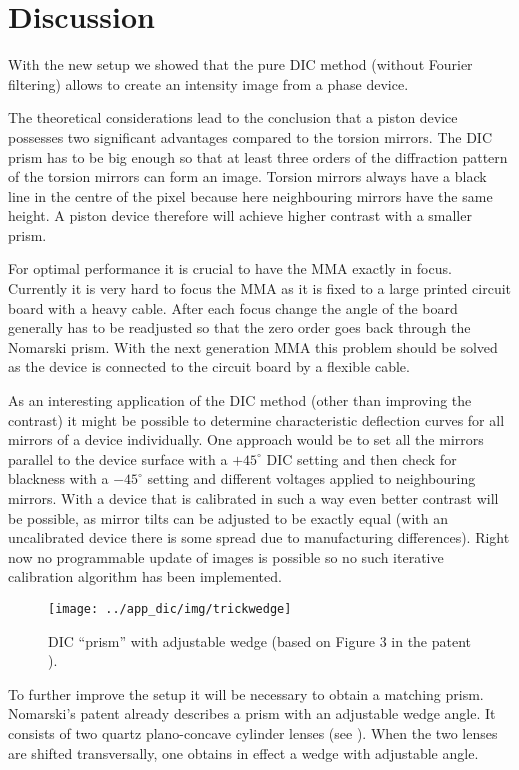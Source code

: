 \section{Discussion}
With the new setup we showed that the pure DIC method (without Fourier
filtering) allows to create an intensity image from a phase device.

The theoretical considerations lead to the conclusion that a piston
device possesses two significant advantages compared to the torsion
mirrors. The DIC prism has to be big enough so that at least three
orders of the diffraction pattern of the torsion mirrors can form an
image. Torsion mirrors always have a black line in the centre of the
pixel because here neighbouring mirrors have the same height. A piston
device therefore will achieve higher contrast with a smaller prism.

For optimal performance it is crucial to have the MMA exactly in
focus. Currently it is very hard to focus the MMA as it is fixed to a
large printed circuit board with a heavy cable. After each focus
change the angle of the board generally has to be readjusted so that
the zero order goes back through the Nomarski prism. With the next
generation MMA this problem should be solved as the device is
connected to the circuit board by a flexible cable.

As an interesting application of the DIC method (other than improving
the contrast) it might be possible to determine characteristic
deflection curves for all mirrors of a device individually. One
approach would be to set all the mirrors parallel to the device
surface with a $+45^\circ$ DIC setting and then check for blackness
with a $-45^\circ$ setting and different voltages applied to
neighbouring mirrors. With a device that is calibrated in such a way
even better contrast will be possible, as mirror tilts can be adjusted
to be exactly equal (with an uncalibrated device there is some spread
due to manufacturing differences). Right now no programmable update of
images is possible so no such iterative calibration algorithm has been
implemented.

\begin{figure}[p]
  \centering
  \texttt{[image: ../app\_dic/img/trickwedge]}
  \caption{DIC ``prism'' with adjustable wedge (based on Figure 3
    in the patent \cite{1960Nomarski}).}
  \label{fig:trickwedge}
\end{figure}

To further improve the setup it will be necessary to obtain a matching
prism.  Nomarski's patent \cite{1960Nomarski} already describes a
prism with an adjustable wedge angle. It consists of two quartz
plano-concave cylinder lenses (see ). When the
two lenses are shifted transversally, one obtains in effect a wedge
with adjustable angle.


